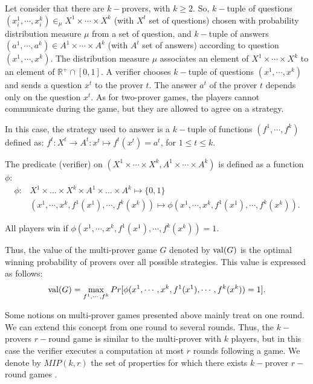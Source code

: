 Let consider that there are $k-$provers, with $k \geq 2$. So, $k-$tuple of questions $(x_i^1, \cdots , x_i^k) \in_{\mu}  X^1  \times \cdots \times X^k $ (with $X^t$ set of questions)
chosen with probability distribution measure $\mu $ from a set of question,
and $k-$tuple of answers $(a^1, \cdots , a^k)  \in A^1 \times \cdots \times A^k$ (with $A^t$ set of answers) according to question $(x^1, \cdots , x^k).$ The distribution measure $\mu $ associates an element of $ X^1  \times \cdots \times X^k $ to an element of $\mathbb{R}^+ \cap [0,1].$
\Jnote{$\mathbb{R}^+ \cap [0,1] = (0, 1].$}
A verifier chooses $k-$tuple of questions $(x^1, \cdots , x^k)$ and sends a question $x^t$ to the prover $t$. The answer $a^t$ of the prover $t$ depends only on the question $x^t.$ As for two-prover games, the players cannot communicate during the game, but they are allowed to agree on a strategy. 

In this case, the strategy used to answer is a $k-$tuple of functions $(f^1, \cdots , f^k)$ defined as:
$f^t: X^t \longrightarrow A^t: x^t \longmapsto f^t(x^t)=a^t$, for $1\leq t \leq k.$

The predicate (verifier) on $( X^1 \times \cdots \times X^k, A^1 \times \cdots \times A^k)$ is defined as a function $\phi$:
\begin{align*}
\phi : & X^1 \times \ldots \times X^k \times A^1 \times \ldots \times A^k \longmapsto \{0,1\} \\
& (x^1, \cdots , x^k, f^1(x^1), \cdots , f^k(x^k)) \longmapsto \phi (x^1, \cdots , x^k, f^1(x^1), \cdots , f^k(x^k)).
\end{align*}

All players win if $\phi (x^1, \cdots , x^k, f^1(x^1), \cdots , f^k(x^k))=1.$ 

Thus, the value of the multi-prover game $G$ denoted by $\mathrm{val} (G)$ is  the optimal winning probability of provers over all possible strategies. This value is expressed as follows:
$$\mathrm{val} (G)= \max_{f^1, \cdots , f^k} Pr[\phi (x^1, \cdots , x^k, f^1(x^1), \cdots , f^k(x^k))=1].$$


Some notions on multi-prover games presented above  mainly treat on one round. We can extend this concept from one round to several rounds. Thus, the $k-$provers $r-$round game is similar to the multi-prover with $k$ players, but in this case the verifier executes a computation at most $r$ rounds following a game. We denote  by $MIP(k,r)$ the set of properties for which there exists $k-$prover $r-$round games  \citep{ben1988multi,tamaki2015parallel}.



